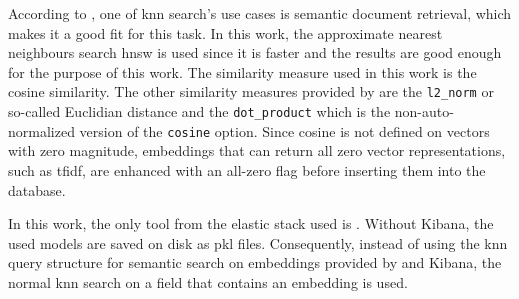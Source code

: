According to \citeauthor{Elasticsearch-kNN-HNSW}, one of \ac{knn} search's use cases is semantic document retrieval, which makes it a good fit for this task.
In this work, the approximate nearest neighbours search \ac{hnsw} is used since it is faster and the results are good enough for the purpose of this work.
The similarity measure used in this work is the cosine similarity. %
The other similarity measures provided by \databaseName{} are the \texttt{l2\_norm} or 
so-called Euclidian distance and the \texttt{dot\_product} which is the non-auto-normalized version of the \texttt{cosine} option.
Since cosine is not defined on vectors with zero magnitude, embeddings that can return all zero vector representations, such as \ac{tfidf}, 
are enhanced with an all-zero flag before inserting them into the database.


In this work, the only tool from the elastic stack used is \databaseName{}.
Without Kibana, the used models are saved on disk as \ac{pkl} files.
Consequently, instead of using the \ac{knn} query structure for semantic search on embeddings provided by \databaseName{} and Kibana, the normal \ac{knn} search on a field that contains an embedding is used.